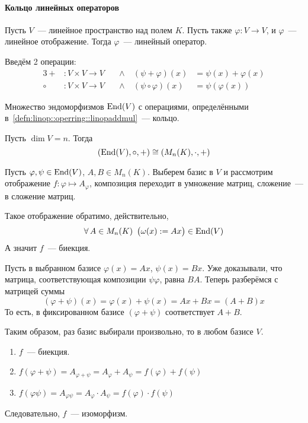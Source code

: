 \documentclass[12pt]{../../../notes}
\begin{document}
\setcounter{paragraph}{7}

\paragraph{Кольцо линейных операторов}

\begin{defn}\label{defn:linop::operring::linop}
  Пусть $V$~--- линейное пространство над полем $K$. Пусть также $\varphi \colon V \to V$, и
  $\varphi$~--- линейное отображение. Тогда $\varphi$~--- линейный оператор.
\end{defn}

\begin{defn}\label{defn:linop::operring::linopaddmul}
  Введём 2 операции:
  \begin{alignat*}{3}
    +     &\colon V\times V \to V & \:&\wedge\: & (\psi + \varphi)(x) &= \psi(x) + \varphi(x) \\
    \circ &\colon V\times V \to V & \:&\wedge\: & (\psi \circ \varphi)(x) &= \psi(\varphi(x))
  \end{alignat*}
\end{defn}

\begin{thrm}\label{thrm:linop::operring::operring}
  Множество эндоморфизмов $\operatorname{End}(V)$ с операциями, определёнными 
  в~\ref{defn:linop::operring::linopaddmul}~--- кольцо.
\end{thrm}

\begin{thrm}\label{thrm:linop::operring::isommtx}
  Пусть $\dim V = n$. Тогда
  \[
    (\operatorname{End} (V),\circ,+) \cong (M_n(K), \cdot, +)
  \]
\end{thrm}
\begin{ittproof}
  Пусть $\varphi, \psi \in \operatorname{End}(V)$, $A, B \in M_n(K)$.
  Выберем базис в $V$ и рассмотрим отображение $f \colon \varphi \mapsto A_\varphi$,
  композиция переходит в умножение матриц, сложение~--- в сложение матриц.

  Такое отображение обратимо, действительно, 
  \[
    \forall\, A \in M_n(K) \;\: \big( \omega(x) := A x \big) \in \operatorname{End}(V)
  \]
  А значит $f$~--- биекция.

  Пусть в выбранном базисе $\varphi(x) =  Ax$, $\psi(x) = Bx$. 
  Уже доказывали, что матрица, соответствующая композиции $\psi\varphi$, равна $BA$.
  Теперь разберёмся с матрицей суммы
  \[
    (\varphi + \psi)(x) = \varphi(x) + \psi(x) = A x + B x = (A+B) x
  \]
  То есть, в фиксированном базисе $(\varphi+\psi)$ соответствует $A+B$.
  
  Таким образом, раз базис выбирали произвольно, то в любом базисе $V$.
  \begin{enumerate}
    \item $f$~--- биекция.
    \item $f(\varphi + \psi) = A_{\varphi+\psi} = A_\varphi + A_\psi = f(\varphi) + f(\psi)$
    \item $f(\varphi \psi) = A_{\varphi\psi} = A_\varphi \cdot A_\psi = f(\varphi) \cdot f(\psi)$
  \end{enumerate}
  Следовательно, $f$~--- изоморфизм.
\end{ittproof}
\end{document}
